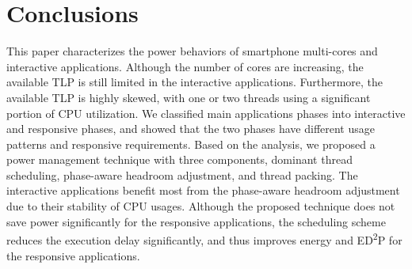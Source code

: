 \chapter{Conclusions}

This paper characterizes the power behaviors of smartphone multi-cores and interactive applications. 
Although the number of cores are increasing, the available TLP is still limited in the interactive
applications. Furthermore, the available TLP is highly skewed, with one or two threads using
a significant portion of CPU utilization. We classified main applications phases into
interactive and responsive phases, and showed that the two phases have different usage patterns
and responsive requirements.
Based on the analysis, we proposed a power management technique with three components,
dominant thread scheduling, phase-aware headroom adjustment, and thread packing. The interactive
applications benefit most from the phase-aware headroom adjustment due to their stability
of CPU usages. Although the proposed technique does not save power significantly for
the responsive applications, the scheduling scheme reduces the execution delay significantly,
and thus improves energy and ED\textsuperscript{2}P for the responsive applications. 



